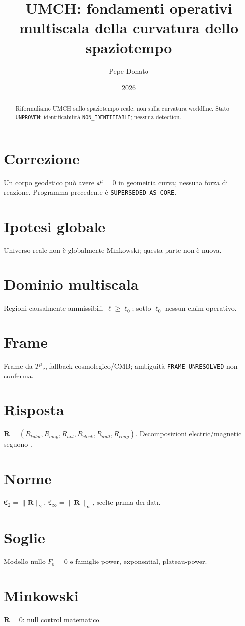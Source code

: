 \documentclass[11pt,a4paper]{article}\usepackage[utf8]{inputenc}\usepackage[T1]{fontenc}\usepackage[italian]{babel}\usepackage{amsmath,amssymb,geometry,hyperref}\geometry{margin=2.7cm}
\title{UMCH: fondamenti operativi multiscala della curvatura dello spaziotempo}\author{Pepe Donato}\date{2026}
\begin{document}
\maketitle
\begin{abstract}Riformuliamo UMCH sullo spaziotempo reale, non sulla curvatura worldline. Stato \texttt{UNPROVEN}; identificabilità \texttt{NON\_IDENTIFIABLE}; nessuna detection.\end{abstract}
\section{Correzione}\label{sec:st-correction}Un corpo geodetico può avere $a^\mu=0$ in geometria curva; nessuna forza di reazione. Programma precedente è \texttt{SUPERSEDED\_AS\_CORE}.
\section{Ipotesi globale}\label{sec:st-global}Universo reale non è globalmente Minkowski; questa parte non è nuova.
\section{Dominio multiscala}\label{sec:st-domain}Regioni causalmente ammissibili, $\ell\ge\ell_0$; sotto $\ell_0$ nessun claim operativo.
\section{Frame}\label{sec:st-frame}Frame da $T^\mu{}_\nu$, fallback cosmologico/CMB; ambiguità \texttt{FRAME\_UNRESOLVED} non conferma.
\section{Risposta}\label{sec:st-response}$\mathbf R=(R_{tidal},R_{mag},R_{hol},R_{clock},R_{null},R_{cong})$. Decomposizioni electric/magnetic seguono \cite{Bonnor1995,MaartensBassett1998}.
\section{Norme}\label{sec:st-norms}$\mathfrak C_2=\|\mathbf R\|_2$, $\mathfrak C_\infty=\|\mathbf R\|_\infty$, scelte prima dei dati.
\section{Soglie}\label{sec:st-thresholds}Modello nullo $F_0=0$ e famiglie power, exponential, plateau-power.
\section{Minkowski}\label{sec:st-minkowski}$\mathbf R=0$: null control matematico.
\end{document}
